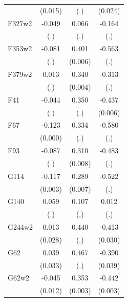 \begin{table}[htbp]
\begin{tabular}{l*{3}{c}}
                &  (0.015)         &      (.)         &  (0.024)         \\
F327w2          &   -0.049         &    0.066         &   -0.164         \\
                &      (.)         &      (.)         &      (.)         \\
F353w2          &   -0.081         &    0.401\sym{***}&   -0.563         \\
                &      (.)         &  (0.006)         &      (.)         \\
F379w2          &    0.013         &    0.340\sym{***}&   -0.313         \\
                &      (.)         &  (0.004)         &      (.)         \\
F41             &   -0.044         &    0.350         &   -0.437\sym{***}\\
                &      (.)         &      (.)         &  (0.006)         \\
F67             &   -0.123\sym{***}&    0.334         &   -0.580         \\
                &  (0.000)         &      (.)         &      (.)         \\
F93             &   -0.087         &    0.310\sym{***}&   -0.483         \\
                &      (.)         &  (0.008)         &      (.)         \\
G114            &   -0.117\sym{***}&    0.289\sym{***}&   -0.522         \\
                &  (0.003)         &  (0.007)         &      (.)         \\
G140            &    0.059         &    0.107         &    0.012         \\
                &      (.)         &      (.)         &      (.)         \\
G244w2          &    0.013         &    0.440         &   -0.413\sym{***}\\
                &  (0.028)         &      (.)         &  (0.030)         \\
G62             &    0.039         &    0.467         &   -0.390\sym{***}\\
                &  (0.033)         &      (.)         &  (0.039)         \\
G62w2           &   -0.045\sym{***}&    0.353\sym{***}&   -0.442\sym{***}\\
                &  (0.012)         &  (0.003)         &  (0.003)         \\

\end{tabular}
\end{table}
